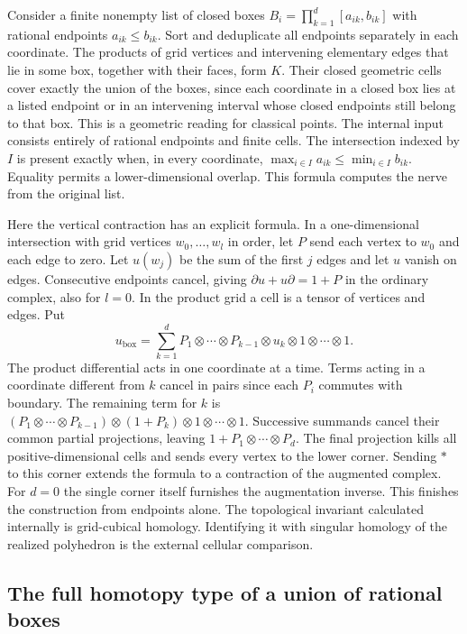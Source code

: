 Consider a finite nonempty list of closed boxes
$B_i=\prod_{k=1}^d[a_{ik},b_{ik}]$ with rational endpoints
$a_{ik}\le b_{ik}$. Sort and deduplicate all endpoints separately in each
coordinate. The products of grid vertices and intervening elementary edges
that lie in some box, together with their faces, form $K$. Their closed
geometric cells cover exactly the union of the boxes, since each coordinate in a
closed box lies at a listed endpoint or in an intervening interval whose
closed endpoints still belong to that box. This is a geometric reading
for classical points. The internal input consists entirely of rational
endpoints and finite cells. The intersection indexed by
$I$ is present exactly when, in every coordinate,
$\max_{i\in I}a_{ik}\le\min_{i\in I}b_{ik}$. Equality permits a
lower-dimensional overlap. This formula computes the nerve from the original
list.

Here the vertical contraction has an explicit formula. In a one-dimensional
intersection with grid vertices $w_0,\ldots,w_l$ in order, let $P$
send each vertex to $w_0$ and each edge to zero. Let $u(w_j)$ be the sum of
the first $j$ edges and let $u$ vanish on edges. Consecutive endpoints
cancel, giving $\partial u+u\partial=1+P$ in the ordinary complex,
also for $l=0$. In the product grid a cell is a tensor of vertices and
edges. Put
\[
 u_{\mathrm{box}}=
 \sum_{k=1}^d P_1\otimes\cdots\otimes P_{k-1}\otimes
 u_k\otimes 1\otimes\cdots\otimes 1.
\]
The product differential acts in one coordinate at a time. Terms acting in a
coordinate different from $k$ cancel in pairs since each $P_i$ commutes
with boundary. The remaining term for $k$ is
$(P_1\otimes\cdots\otimes P_{k-1})\otimes(1+P_k)\otimes
 1\otimes\cdots\otimes 1$. Successive summands cancel their common
partial projections, leaving $1+P_1\otimes\cdots\otimes P_d$.
The final projection kills all positive-dimensional cells and sends every
vertex to the lower corner. Sending $*$ to this corner extends the formula
to a contraction of the augmented complex. For $d=0$ the single corner
itself furnishes the augmentation inverse. This finishes the construction
from endpoints alone. The topological invariant calculated internally is
grid-cubical homology. Identifying it with singular homology of the realized
polyhedron is the external cellular comparison.

\subsection{The full homotopy type of a union of rational boxes}

